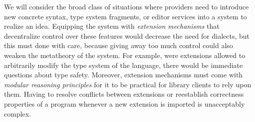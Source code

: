 We will consider the broad class of situations where providers need to introduce new concrete syntax, type system fragments, or editor services into a system to realize an idea. %
Equipping the system with \emph{extension mechanisms} that decentralize control over these features would  decrease the need for dialects, but this must done with care, because giving away too much control could also weaken the metatheory of the system. For example, were extensions allowed to arbitrarily modify the type system of the language, there would be immediate questions about {type safety}. Moreover, extension   mechanisms must come with \emph{modular reasoning principles} for it to be practical for library clients to rely upon them. Having to resolve conflicts between extensions or reestablish correctness properties of a program whenever a new extension is imported is unacceptably complex. %


